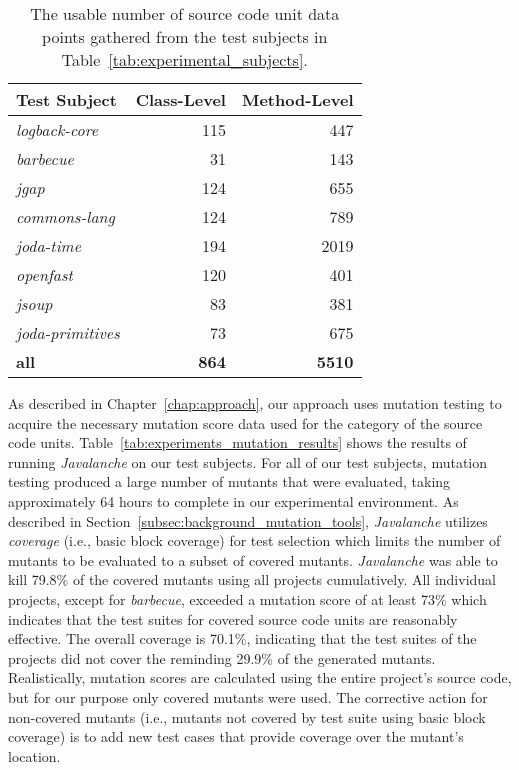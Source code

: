 \begin{sidewaystable}[!tb]
  \centering
  \caption{The usable number of source code unit data points gathered from the test subjects in Table~\ref{tab:experimental_subjects}.}
  \label{tab:experiments_collected_data}
  \begin{threeparttable}
    \begin{tabular}{|l|r|r|}
      \rowcolor[RGB]{169,196,223}
      \hline \textbf{Test Subject} & \textbf{Class-Level} & \textbf{Method-Level} \\
      \hline \emph{logback-core} & 115 & 447 \\
      \hline \emph{barbecue} & 31 & 143 \\
      \hline \emph{jgap} & 124 & 655 \\
      \hline \emph{commons-lang} & 124 & 789 \\
      \hline \emph{joda-time} & 194 & 2019 \\
      \hline \emph{openfast} & 120 & 401 \\
      \hline \emph{jsoup} & 83 & 381 \\
      \hline \emph{joda-primitives} & 73 & 675 \\
      \hline \textbf{all} & \textbf{864} & \textbf{5510} \\
      \hline
    \end{tabular}
  \end{threeparttable}
\end{sidewaystable}
\afterpage\clearpage

\noindent
As described in Chapter~\ref{chap:approach}, our approach uses mutation testing to acquire the necessary mutation score data used for the category of the source code units. Table~\ref{tab:experiments_mutation_results} shows the results of running \emph{Javalanche} on our test subjects. For all of our test subjects, mutation testing produced a large number of mutants that were evaluated, taking approximately 64 hours to complete in our experimental environment. As described in Section~\ref{subsec:background_mutation_tools}, \emph{Javalanche} utilizes \emph{coverage} (i.e., basic block coverage) for test selection which limits the number of mutants to be evaluated to a subset of covered mutants. \emph{Javalanche} was able to kill 79.8\% of the covered mutants using all projects cumulatively. All individual projects, except for \emph{barbecue}, exceeded a mutation score of at least 73\% which indicates that the test suites for covered source code units are reasonably effective. The overall coverage is 70.1\%, indicating that the test suites of the projects did not cover the reminding 29.9\% of the generated mutants. Realistically, mutation scores are calculated using the entire project's source code, but for our purpose only covered mutants were used. The corrective action for non-covered mutants (i.e., mutants not covered by test suite using basic block coverage) is to add new test cases that provide coverage over the mutant's location.

